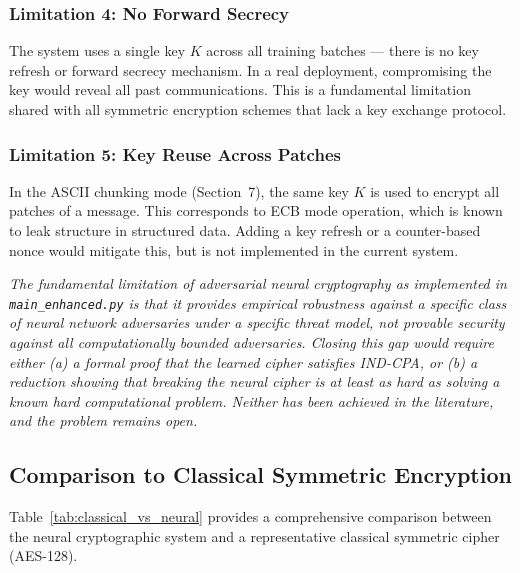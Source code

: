 \documentclass[12pt, a4paper]{article}
\newcommand{\code}[1]{\texttt{\color{CodeRed}#1}}
\begin{document}
\subsubsection*{Limitation 4: No Forward Secrecy}

The system uses a single key $K$ across all training batches ---
there is no key refresh or forward secrecy mechanism. In a real
deployment, compromising the key would reveal all past communications.
This is a fundamental limitation shared with all symmetric encryption
schemes that lack a key exchange protocol.

\subsubsection*{Limitation 5: Key Reuse Across Patches}

In the ASCII chunking mode (Section~7), the same key $K$ is
used to encrypt all patches of a message. This corresponds to ECB
mode operation, which is known to leak structure in structured data.
Adding a key refresh or a counter-based nonce would mitigate this,
but is not implemented in the current system.

\begin{tcolorbox}[researchbox, title={The Provable Security Gap}]
  \itshape
  The fundamental limitation of adversarial neural cryptography as
  implemented in \code{main\_enhanced.py} is that it provides
  \emph{empirical} robustness against a specific class of neural
  network adversaries under a specific threat model, not
  \emph{provable} security against all computationally bounded
  adversaries. Closing this gap would require either (a) a formal
  proof that the learned cipher satisfies IND-CPA, or (b) a reduction
  showing that breaking the neural cipher is at least as hard as
  solving a known hard computational problem. Neither has been
  achieved in the literature, and the problem remains open.
\end{tcolorbox}

\subsection{Comparison to Classical Symmetric Encryption}
\label{subsec:classical_comparison}

Table~\ref{tab:classical_vs_neural} provides a comprehensive comparison
between the neural cryptographic system and a representative classical
symmetric cipher (AES-128).
\end{document}
